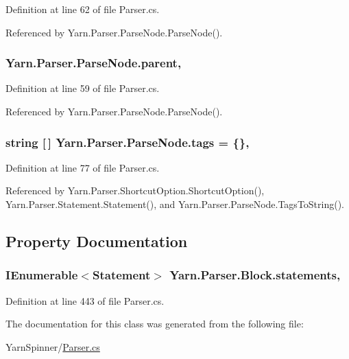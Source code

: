 Definition at line 62 of file Parser.\-cs.



Referenced by Yarn.\-Parser.\-Parse\-Node.\-Parse\-Node().

\hypertarget{a00148_af313a82103fcc2ff5a177dbb06b92f7b}{
\subsubsection[{parent}]{ Yarn.\-Parser.\-Parse\-Node.\-parent\hspace{0.3cm}{\ttfamily [package]}, {\ttfamily [inherited]}}}\label{a00148_af313a82103fcc2ff5a177dbb06b92f7b}


Definition at line 59 of file Parser.\-cs.



Referenced by Yarn.\-Parser.\-Parse\-Node.\-Parse\-Node().

\hypertarget{a00148_a58b3a15788fd2d4127d73619dc6d04ae}{
\subsubsection[{tags}]{\setlength{\rightskip}{0pt plus 5cm}string \mbox{[}$\,$\mbox{]} Yarn.\-Parser.\-Parse\-Node.\-tags = \{\}\hspace{0.3cm}{\ttfamily [package]}, {\ttfamily [inherited]}}}\label{a00148_a58b3a15788fd2d4127d73619dc6d04ae}


Definition at line 77 of file Parser.\-cs.



Referenced by Yarn.\-Parser.\-Shortcut\-Option.\-Shortcut\-Option(), Yarn.\-Parser.\-Statement.\-Statement(), and Yarn.\-Parser.\-Parse\-Node.\-Tags\-To\-String().



\subsection{Property Documentation}
\hypertarget{a00043_a42e3d555bbd5ecbdf61c45ad715be7e1}{
\subsubsection[{statements}]{\setlength{\rightskip}{0pt plus 5cm}I\-Enumerable$<${\bf Statement}$>$ Yarn.\-Parser.\-Block.\-statements\hspace{0.3cm}{\ttfamily [get]}, {\ttfamily [package]}}}\label{a00043_a42e3d555bbd5ecbdf61c45ad715be7e1}


Definition at line 443 of file Parser.\-cs.



The documentation for this class was generated from the following file\-:\begin{DoxyCompactItemize}
\item 
Yarn\-Spinner/\hyperlink{a00313}{Parser.\-cs}\end{DoxyCompactItemize}
